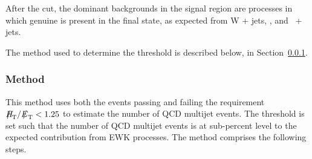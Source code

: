 After the \alphat cut, the dominant backgrounds in the signal region are processes in which genuine \met is present in the final state, as expected from W + jets, \ttbar, and \znunu\ + jets.

The method used to determine the \alphat threshold is described below, in Section~\ref{sec:qcd-method}.

\subsubsection{Method}
\label{sec:qcd-method}
This method uses both the events passing and failing the requirement $\mhtmet < 1.25$ to estimate the number of QCD multijet events. The \alphat threshold is set such that the number of QCD multijet events is at sub-percent level to the expected contribution from EWK processes. The method comprises the following steps.

